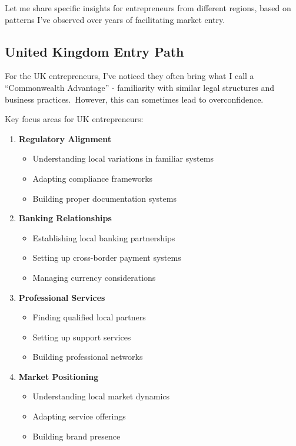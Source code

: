 Let me share specific insights for entrepreneurs from different regions, based on patterns I've observed over years of facilitating market entry.

\subsection{United Kingdom Entry Path}\label{subsec:united-kingdom-entry-path}

For the UK entrepreneurs, I've noticed they often bring what I call a ``Commonwealth Advantage'' - familiarity with similar legal structures and business practices.\ However, this can sometimes lead to overconfidence.

Key focus areas for UK entrepreneurs:

\begin{enumerate}
    \item \textbf{Regulatory Alignment}
    \begin{itemize}
        \item Understanding local variations in familiar systems
        \item Adapting compliance frameworks
        \item Building proper documentation systems
    \end{itemize}
    \item \textbf{Banking Relationships}
    \begin{itemize}
        \item Establishing local banking partnerships
        \item Setting up cross-border payment systems
        \item Managing currency considerations
    \end{itemize}
    \item \textbf{Professional Services}
    \begin{itemize}
        \item Finding qualified local partners
        \item Setting up support services
        \item Building professional networks
    \end{itemize}
    \item \textbf{Market Positioning}
    \begin{itemize}
        \item Understanding local market dynamics
        \item Adapting service offerings
        \item Building brand presence
    \end{itemize}
\end{enumerate}

